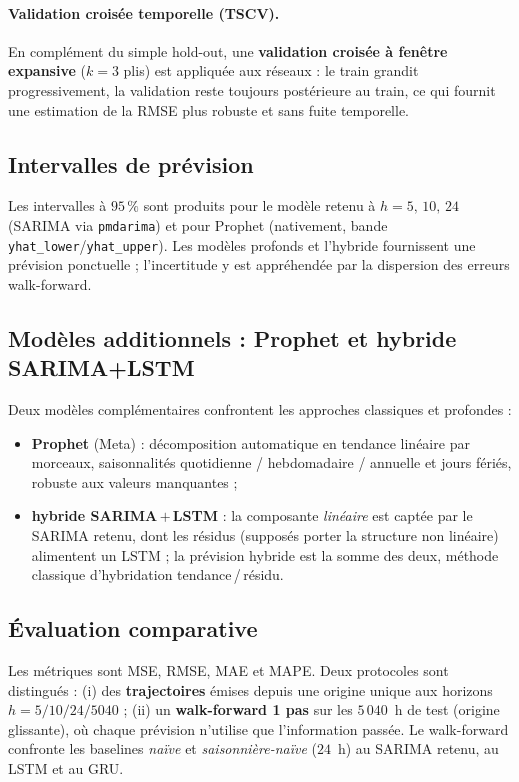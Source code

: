 \paragraph{Validation croisée temporelle (TSCV).}
En complément du simple hold-out, une \textbf{validation croisée à fenêtre
expansive} (\(k=3\) plis) est appliquée aux réseaux : le train grandit
progressivement, la validation reste toujours postérieure au train, ce qui
fournit une estimation de la RMSE plus robuste et sans fuite temporelle.

\subsection{Intervalles de prévision}
Les intervalles à \(95\,\%\) sont produits pour le modèle retenu à
\(h=5,\,10,\,24\) (SARIMA via \texttt{pmdarima}) et pour Prophet
(nativement, bande \texttt{yhat\_lower}/\texttt{yhat\_upper}). Les modèles
profonds et l'hybride fournissent une prévision ponctuelle ; l'incertitude y
est appréhendée par la dispersion des erreurs walk-forward.

\subsection{Modèles additionnels : Prophet et hybride SARIMA+LSTM}
Deux modèles complémentaires confrontent les approches classiques et
profondes :
\begin{itemize}
  \item \textbf{Prophet} (Meta) : décomposition automatique en tendance
        linéaire par morceaux, saisonnalités quotidienne / hebdomadaire /
        annuelle et jours fériés, robuste aux valeurs manquantes ;
  \item \textbf{hybride SARIMA\,$+$\,LSTM} : la composante \emph{linéaire}
        est captée par le SARIMA retenu, dont les résidus (supposés porter la
        structure non linéaire) alimentent un LSTM ; la prévision hybride est
        la somme des deux, méthode classique d'hybridation
        tendance\,/\,résidu.
\end{itemize}


\subsection{Évaluation comparative}
Les métriques sont MSE, RMSE, MAE et MAPE. Deux protocoles sont distingués :
(i) des \textbf{trajectoires} émises depuis une origine unique aux horizons
\(h=5/10/24/5040\) ; (ii) un \textbf{walk-forward 1 pas} sur les \(5\,040\)~h
de test (origine glissante), où chaque prévision n'utilise que l'information
passée. Le walk-forward confronte les baselines \emph{naïve} et
\emph{saisonnière-naïve} (\(24\)~h) au SARIMA retenu, au LSTM et au GRU.

